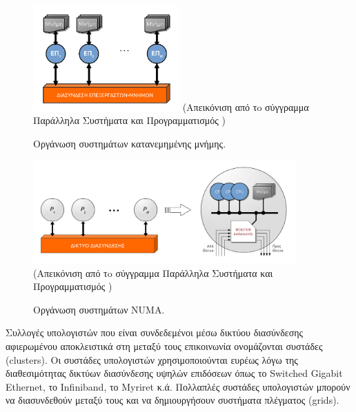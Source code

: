 \begin{figure}[t]
	\centering
	\includegraphics[width=0.5\textwidth]{Figures/dmm.png}
	\linebreak
	{\small (Απεικόνιση από τo σύγγραμμα Παράλληλα Συστήματα και Προγραμματισμός \cite{dimakopoulos2015parallila})}
	\caption{Οργάνωση συστημάτων κατανεμημένης μνήμης.}
	\label{fig:dmm}
\end{figure}

\begin{figure}[t]
	\centering
	\includegraphics[width=0.9\textwidth]{Figures/numa.png}
	\linebreak 
	{\small (Απεικόνιση από τo σύγγραμμα Παράλληλα Συστήματα και Προγραμματισμός \cite{dimakopoulos2015parallila})}
	\caption{Οργάνωση συστημάτων NUMA.}
	\label{fig:numa}
\end{figure}


Συλλογές υπολογιστών που είναι συνδεδεμένοι μέσω δικτύου διασύνδεσης αφιερωμένου αποκλειστικά στη μεταξύ τους επικοινωνία ονομάζονται συστάδες (clusters). Οι συστάδες υπολογιστών χρησιμοποιούνται ευρέως λόγω της διαθεσιμότητας δικτύων διασύνδεσης υψηλών επιδόσεων όπως το Switched Gigabit Ethernet, το Infiniband, το Myriret κ.ά. Πολλαπλές συστάδες υπολογιστών μπορούν να διασυνδεθούν μεταξύ τους και να δημιουργήσουν συστήματα πλέγματος (grids).


